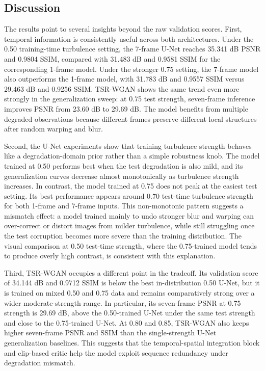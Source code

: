 \documentclass{article}
\begin{document}
\subsection{Discussion}
The results point to several insights beyond the raw validation scores. First, temporal information is consistently useful across both architectures. Under the 0.50 training-time turbulence setting, the 7-frame U-Net reaches 35.341 dB PSNR and 0.9804 SSIM, compared with 31.483 dB and 0.9581 SSIM for the corresponding 1-frame model. Under the stronger 0.75 setting, the 7-frame model also outperforms the 1-frame model, with 31.783 dB and 0.9557 SSIM versus 29.463 dB and 0.9256 SSIM. TSR-WGAN shows the same trend even more strongly in the generalization sweep: at 0.75 test strength, seven-frame inference improves PSNR from 23.60 dB to 29.69 dB. The model benefits from multiple degraded observations because different frames preserve different local structures after random warping and blur.

Second, the U-Net experiments show that training turbulence strength behaves like a degradation-domain prior rather than a simple robustness knob. The model trained at 0.50 performs best when the test degradation is also mild, and its generalization curves decrease almost monotonically as turbulence strength increases. In contrast, the model trained at 0.75 does not peak at the easiest test setting. Its best performance appears around 0.70 test-time turbulence strength for both 1-frame and 7-frame inputs. This non-monotonic pattern suggests a mismatch effect: a model trained mainly to undo stronger blur and warping can over-correct or distort images from milder turbulence, while still struggling once the test corruption becomes more severe than the training distribution. The visual comparison at 0.50 test-time strength, where the 0.75-trained model tends to produce overly high contrast, is consistent with this explanation.

Third, TSR-WGAN occupies a different point in the tradeoff. Its validation score of 34.144 dB and 0.9712 SSIM is below the best in-distribution 0.50 U-Net, but it is trained on mixed 0.50 and 0.75 data and remains comparatively strong over a wider moderate-strength range. In particular, its seven-frame PSNR at 0.75 strength is 29.69 dB, above the 0.50-trained U-Net under the same test strength and close to the 0.75-trained U-Net. At 0.80 and 0.85, TSR-WGAN also keeps higher seven-frame PSNR and SSIM than the single-strength U-Net generalization baselines. This suggests that the temporal-spatial integration block and clip-based critic help the model exploit sequence redundancy under degradation mismatch.
\end{document}
